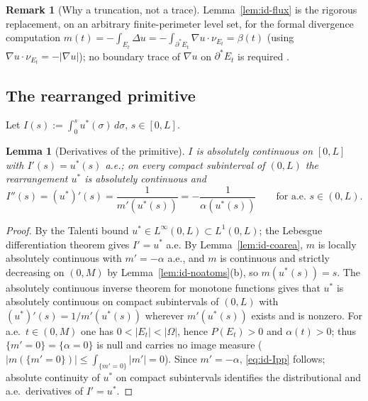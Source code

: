 \documentclass[11pt]{amsart}
\newtheorem{lemma}[theorem]{Lemma}
\theoremstyle{definition}
\newtheorem{remark}[theorem]{Remark}
\newcommand{\Om}{\Omega}
\newcommand{\Per}{P}
\begin{document}
\begin{remark}[Why a truncation, not a trace]\label{rem:id-flux}
Lemma~\ref{lem:id-flux} is the rigorous replacement, on an arbitrary
finite-perimeter level set, for the formal divergence computation
\(m(t)=-\int_{E_t}\Delta u=-\int_{\partial^*E_t}\nabla u\cdot\nu_{E_t}=\beta(t)\)
(using \(\nabla u\cdot\nu_{E_t}=-|\nabla u|\)); no boundary trace of
\(\nabla u\) on \(\partial^*E_t\) is required \cite[Ch.~17]{Maggi2012}.
\end{remark}

\subsection*{The rearranged primitive}

Let \(I(s):=\int_0^s u^*(\sigma)\,d\sigma\), \(s\in[0,L]\).

\begin{lemma}[Derivatives of the primitive]\label{lem:id-I}
\(I\) is absolutely continuous on \([0,L]\) with \(I'(s)=u^*(s)\) a.e.; on every
compact subinterval of \((0,L)\) the rearrangement \(u^*\) is absolutely
continuous and
\begin{equation}\label{eq:id-Ipp}
   I''(s)=(u^*)'(s)=\frac{1}{m'(u^*(s))}=-\frac{1}{\alpha(u^*(s))}
   \qquad\text{for a.e.\ }s\in(0,L).
\end{equation}
\end{lemma}

\begin{proof}
By the Talenti bound \(u^*\in L^\infty(0,L)\subset L^1(0,L)\); the Lebesgue
differentiation theorem gives \(I'=u^*\) a.e.  By Lemma~\ref{lem:id-coarea},
\(m\) is locally absolutely continuous with \(m'=-\alpha\) a.e., and \(m\) is
continuous and strictly decreasing on \((0,M)\) by
Lemma~\ref{lem:id-noatoms}(b), so \(m(u^*(s))=s\).  The absolutely continuous
inverse theorem for monotone functions \cite[Thm.~0.4, \S1]{BBC1975} gives that
\(u^*\) is absolutely continuous on compact subintervals of \((0,L)\) with
\((u^*)'(s)=1/m'(u^*(s))\) wherever \(m'(u^*(s))\) exists and is nonzero.  For
a.e.\ \(t\in(0,M)\) one has \(0<|E_t|<|\Om|\), hence \(\Per(E_t)>0\) and
\(\alpha(t)>0\); thus \(\{m'=0\}=\{\alpha=0\}\) is null and carries no image
measure (\(|m(\{m'=0\})|\le\int_{\{m'=0\}}|m'|=0\)).  Since \(m'=-\alpha\),
\eqref{eq:id-Ipp} follows; absolute continuity of \(u^*\) on compact
subintervals identifies the distributional and a.e.\ derivatives of
\(I'=u^*\).
\end{proof}
\end{document}
